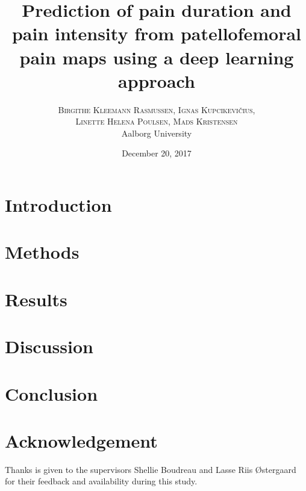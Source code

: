 \documentclass[twoside,twocolumn]{article}
\title{\huge Prediction of pain duration and pain intensity \newline from patellofemoral pain maps using a \newline deep learning approach} %
\author{%
\textsc{Birgithe Kleemann Rasmussen, Ignas Kupcikevičius,} \\
\textsc{Linette Helena Poulsen, Mads Kristensen}
 \\[1ex] %
\normalsize Aalborg University \\ %
}
\date{December 20, 2017} %
\begin{document}
\maketitle


\section{Introduction}



\section{Methods}



\newpage
\section{Results}



\newpage
\section{Discussion}



\section{Conclusion}


\section{Acknowledgement}
Thanks is given to the supervisors Shellie Boudreau and Lasse Riis Østergaard for their feedback and availability during this study.  

\end{document}
